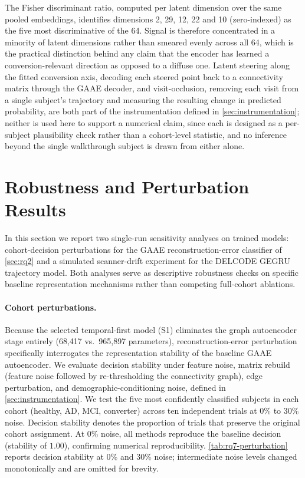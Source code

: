 The Fisher discriminant ratio, computed per latent dimension over the same pooled
embeddings, identifies dimensions 2, 29, 12, 22 and 10 (zero-indexed) as the five most
discriminative of the 64. Signal is therefore concentrated in a minority of latent
dimensions rather than smeared evenly across all 64, which is the practical distinction
behind any claim that the encoder has learned a conversion-relevant direction as opposed to a
diffuse one. Latent steering along the fitted conversion axis, decoding each steered point back
to a connectivity matrix through the \ac{GAAE} decoder, and visit-occlusion, removing each
visit from a single subject's trajectory and measuring the resulting change in predicted
probability, are both part of the instrumentation defined in \autoref{sec:instrumentation};
neither is used here to support a numerical claim, since each is designed as a per-subject
plausibility check rather than a cohort-level statistic, and no inference beyond the single
walkthrough subject is drawn from either alone.

\section{Robustness and Perturbation Results}\label{sec:robustness-results}

In this section we report two single-run sensitivity analyses on trained models: cohort-decision perturbations for the \ac{GAAE} reconstruction-error classifier of \autoref{sec:rq2} and a simulated scanner-drift experiment for the \ac{DELCODE} \ac{GEGRU} trajectory model. Both analyses serve as descriptive robustness checks on specific baseline representation mechanisms rather than competing full-cohort ablations.

\paragraph{Cohort perturbations.} Because the selected temporal-first model (S1) eliminates the graph autoencoder stage entirely (68{,}417 vs.\ 965{,}897 parameters), reconstruction-error perturbation specifically interrogates the representation stability of the baseline \ac{GAAE} autoencoder. We evaluate decision stability under feature noise, matrix rebuild (feature noise followed by re-thresholding the connectivity graph), edge perturbation, and demographic-conditioning noise, defined in \autoref{sec:instrumentation}. We test the five most confidently classified subjects in each cohort (healthy, \ac{AD}, \ac{MCI}, converter) across ten independent trials at 0\% to 30\% noise. Decision stability denotes the proportion of trials that preserve the original cohort assignment. At 0\% noise, all methods reproduce the baseline decision (stability of $1.00$), confirming numerical reproducibility. \autoref{tab:rq7-perturbation} reports decision stability at 0\% and 30\% noise; intermediate noise levels changed monotonically and are omitted for brevity.

